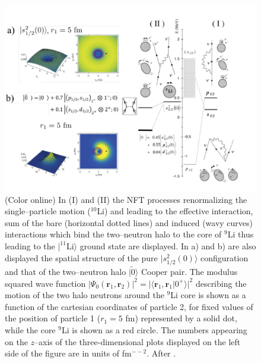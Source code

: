   \begin{figure}
  \centerline{\includegraphics*[width=\textwidth,angle=0]{nutshell/figs/fig1F3.pdf}}
  \caption{(Color online) In (I) and (II) the NFT processes renormalizing the single--particle motion ($^{10}$Li) and leading to the effective interaction, sum of the bare (horizontal dotted lines) and induced (wavy curves) interactions which bind the two--neutron halo to the core of $^{9}$Li  thus leading to the $|^{11}$Li$\rangle$ ground state are displayed. In a) and b) are also displayed the  spatial structure of the pure $|s_{1/2}^2(0)\rangle$ configuration and that of the two--neutron halo $|\tilde 0\rangle$ Cooper pair. The modulus squared wave function $|\Psi_0(\mathbf{r}_1,\mathbf{r}_2)|^2=|\langle \mathbf{r}_1,\mathbf{r}_1|0^+\rangle|^2$ describing the motion of the two halo neutrons around the $^9$Li core 
  is shown as a function of the cartesian coordinates of particle 2, for fixed values of the
  position of particle 1 ($r_1 = 5$ fm) represented  by a solid dot, while the core $^9$Li is shown as a red
  circle. The numbers appearing on the $z$--axis of the three-dimensional plots displayed on the left side of the figure are in units of fm$^{-−2}$. After \cite{Barranco:01}.}\label{fig1F3}
  \end{figure}

